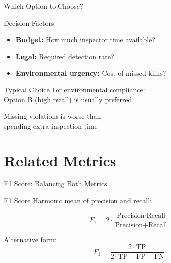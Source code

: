 \documentclass{beamer}
\begin{document}
\begin{frame}{Which Option to Choose?}
\begin{alertblock}{Decision Factors}
\begin{itemize}
    \item \textbf{Budget:} How much inspector time available?
    \item \textbf{Legal:} Required detection rate?
    \item \textbf{Environmental urgency:} Cost of missed kilns?
\end{itemize}
\end{alertblock}

\vspace{0.3cm}

\begin{keypointsbox}{Typical Choice}
For environmental compliance: \\
Option B (high recall) is usually preferred

\vspace{0.2cm}

Missing violations is worse than \\
spending extra inspection time
\end{keypointsbox}
\end{frame}

\section{Related Metrics}

\begin{frame}{F1 Score: Balancing Both Metrics}
\begin{definitionbox}{F1 Score}
Harmonic mean of precision and recall:

$$F_1 = 2 \cdot \frac{\text{Precision} \cdot \text{Recall}}{\text{Precision} + \text{Recall}}$$

\vspace{0.2cm}

Alternative form:
$$F_1 = \frac{2 \cdot \text{TP}}{2 \cdot \text{TP} + \text{FP} + \text{FN}}$$
\end{definitionbox}
\end{frame}
\end{document}

